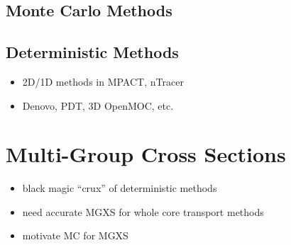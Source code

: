 \subsection{Monte Carlo Methods}
\label{subsec:chap1-monte-carlo}


\subsection{Deterministic Methods}
\label{subsec:chap1-deterministic}

\begin{itemize}
  \item 2D/1D methods in MPACT, nTracer
  \item Denovo, PDT, 3D OpenMOC, etc.
\end{itemize}


\section{Multi-Group Cross Sections}
\label{sec:chap1-mgxs}

\begin{itemize}
  \item black magic ``crux'' of deterministic methods
  \item need accurate \ac{MGXS} for whole core transport methods
  \item motivate \ac{MC} for \ac{MGXS}
\end{itemize}
